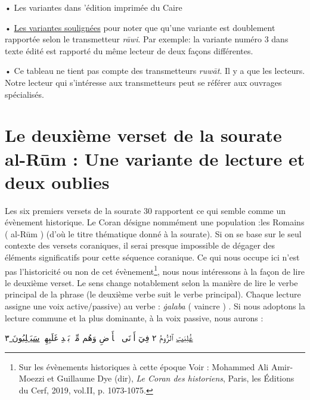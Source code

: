 \documentclass[a4paper,12pt]{report}
\begin{document}
\begin{itemize}
\begin{enumerate}
• Les variantes dans ’édition imprimée du Caire 

•	\underline{Les variantes soulignées} pour noter que qu’une variante  est doublement  rapportée  selon le  transmetteur \textit{rāwi}. Par exemple: la variante numéro 3 dans texte édité  est rapporté du même lecteur de deux façons différentes.  

• Ce  tableau ne tient pas compte des transmetteurs \textit{ruw\=at}. Il y a que les lecteurs. Notre lecteur qui s'intéresse aux transmetteurs peut se référer aux ouvrages  spécialisés. 














\newpage
\section{	Le deuxième verset de la sourate al-Rūm : Une variante de lecture et deux oublies}

Les six premiers  versets de la sourate 30 rapportent ce qui semble comme un évènement historique.  Le Coran désigne nommément une population :les Romains  ( al-Rūm ) (d'où le titre thématique donné à  la sourate). Si on se base sur le seul contexte des versets  coraniques,  il serai presque impossible de dégager des éléments significatifs pour cette séquence coranique. Ce qui nous  occupe ici n'est pas l'historicité ou non de cet évènement\footnote{ Sur les évènements historiques à cette époque Voir : Mohammed Ali Amir-Moezzi et Guillaume Dye (dir), \textit{Le Coran des historiens}, Paris, les Éditions du Cerf, 2019, vol.II, p. 1073-1075. }, nous nous intéressons à  la façon de lire le deuxième verset. Le sens change notablement selon la manière de lire le verbe  principal de la phrase (le deuxième verbe suit le verbe principal). Chaque lecture assigne une  voix active/passive)  au verbe :  \textit{ġalaba}   ( vaincre ) . Si nous adoptons la lecture  commune et la plus dominante, à la voix passive, nous aurons :             
\begin{Arabic}
    \begin{center}
      \underline{ غُلِبَتِ}  
       ٱلرُّومُ
       ٢
فِيٓ أَدۡنَى ٱلۡأَرۡضِ 
 وَهُم مِّنۢ 
 بَعۡدِ غَلَبِهِمۡ 
 \underline {سَيَغۡلِبُونَ }
٣
    \end{center}
\end{Arabic}
 


\end{enumerate}
\end{itemize}
\end{document}
